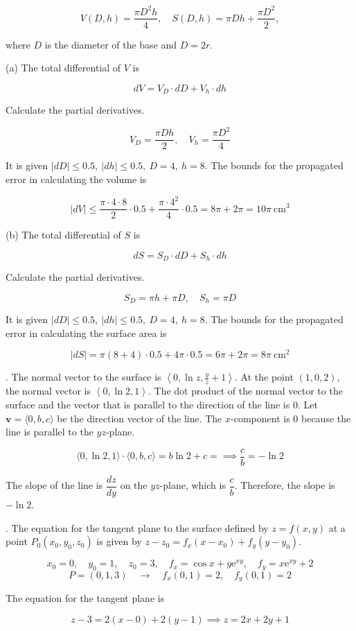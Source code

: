 \documentclass{article}
\begin{document}
\[V(D,h)=\frac{\pi D^2h}4,\quad S(D,h)=\pi Dh+\frac{\pi D^2}2,\]

\noindent where $D$ is the diameter of the base and $D=2r$.

\hfill

\noindent (a) The total differential of $V$ is

\[dV=V_D\cdot dD+V_h\cdot dh\]

\hfill

\noindent Calculate the partial derivatives.

\[V_D=\frac{\pi Dh}2,\quad V_h=\frac{\pi D^2}4\]

\hfill

\noindent It is given $\left|dD\right|\leq0.5,\:|dh|\leq0.5,\:D=4,\:h=8$. The bounds for the propagated error in calculating the volume is

\[|dV|\leq\frac{\pi\cdot4\cdot8}2\cdot0.5+\frac{\pi\cdot4^2}4\cdot0.5=8\pi+2\pi=\boxed{10\pi\:\text{cm}^3}\]

\hfill

\noindent (b) The total differential of $S$ is

\[dS=S_D\cdot dD+S_h\cdot dh\]

\hfill

\noindent Calculate the partial derivatives.

\[S_D=\pi h+\pi D,\quad S_h=\pi D\]

\hfill

\noindent It is given $\left|dD\right|\leq0.5,\:|dh|\leq0.5,\:D=4,\:h=8$. The bounds for the propagated error in calculating the surface area is

\[|dS|=\pi\left(8+4\right)\cdot0.5+4\pi\cdot0.5=6\pi+2\pi=\boxed{8\pi\:\text{cm}^2}\]

\hfill

. The normal vector to the surface is $\left\langle0,\ln z,\frac yz+1\right\rangle$. At the point $(1,0,2)$, the normal vector is $\left\langle0,\ln2,1\right\rangle$. The dot product of the normal vector to the surface and the vector that is parallel to the direction of the line is $0$. Let $\mathbf v=\langle 0,b,c\rangle$ be the direction vector of the line. The $x$-component is $0$ because the line is parallel to the $yz$-plane.

\[\langle0,\ln2,1\rangle\cdot\langle0,b,c\rangle=b\ln2+c=\implies \frac cb=-\ln2\]

\hfil

\noindent The slope of the line is $\dfrac{dz}{dy}$ on the $yz$-plane, which is $\dfrac cb$. Therefore, the slope is $\boxed{-\ln2}$.

\hfill

. The equation for the tangent plane to the surface defined by $z=f(x,y)$ at a point $P_0(x_0,y_0,z_0)$ is given by $z-z_0=f_x(x-x_0)+f_y(y-y_0)$.

\[x_0=0,\quad y_0=1,\quad z_0=3,\quad f_x=\cos x+y\mathrm{e}^{xy},\quad f_y=x\mathrm{e}^{xy}+2\]
\[P=(0,1,3)\quad\rightarrow\quad f_x(0,1)=2,\quad f_y(0,1)=2\]

\hfill

\noindent The equation for the tangent plane is

\[\boxed{z-3=2(x-0)+2(y-1)\implies z=2x+2y+1}\]
\end{document}
